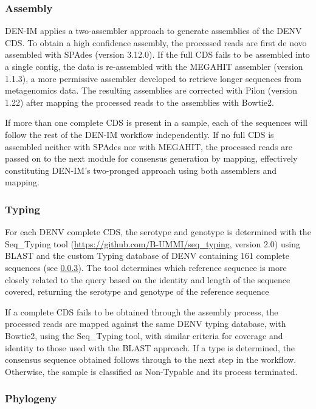 \subsubsection{Assembly}

DEN-IM applies a two-assembler approach to generate assemblies of the DENV CDS. To obtain a high confidence assembly, the processed reads are first de novo assembled with SPAdes \citep{bankevich_spades_2012} (version 3.12.0). If the full CDS fails to be assembled into a single contig, the data is re-assembled with the MEGAHIT assembler \citep{li_megahit_2015} (version 1.1.3), a more permissive assembler developed to retrieve longer sequences from metagenomics data. The resulting assemblies are corrected with Pilon \citep{walker_pilon_2014} (version 1.22) after mapping the processed reads to the assemblies with Bowtie2.

If more than one complete CDS is present in a sample, each of the sequences will follow the rest of the DEN-IM workflow independently. If no full CDS is assembled neither with SPAdes nor with MEGAHIT, the processed reads are passed on to the next module for consensus generation by mapping, effectively constituting DEN-IM’s two-pronged approach using both assemblers and mapping.

\subsubsection{Typing}

For each DENV complete CDS, the serotype and genotype is determined with the Seq\_Typing tool (\url{https://github.com/B-UMMI/seq\_typing}, version 2.0) \citep{machado_epidemiological_2017} using BLAST \citep{altschul_gapped_1997} and the custom Typing database of DENV containing 161 complete sequences (see \ref{}). The tool determines which reference sequence is more closely related to the query based on the identity and length of the sequence covered, returning the serotype and genotype of the reference sequence

If a complete CDS fails to be obtained through the assembly process, the processed reads are mapped against the same DENV typing database, with Bowtie2, using the Seq\_Typing tool, with similar criteria for coverage and identity to those used with the BLAST approach. If a type is determined, the consensus sequence obtained follows through to the next step in the workflow. Otherwise, the sample is classified as Non-Typable and its process terminated.

\subsubsection{Phylogeny}

